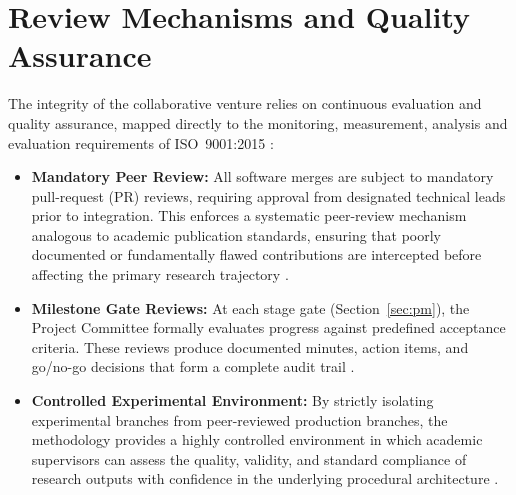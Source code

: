 \documentclass[11pt, a4paper]{article}
\begin{document}
\section{Review Mechanisms and Quality Assurance}\label{sec:qa}

The integrity of the collaborative venture relies on continuous evaluation and quality assurance, mapped directly to the monitoring, measurement, analysis and evaluation requirements of ISO~9001:2015 \cite{iso9001_2015}:

\begin{itemize}
    \item \textbf{Mandatory Peer Review:} All software merges are subject to mandatory pull-request (PR) reviews, requiring approval from designated technical leads prior to integration. This enforces a systematic peer-review mechanism analogous to academic publication standards, ensuring that poorly documented or fundamentally flawed contributions are intercepted before affecting the primary research trajectory \cite[Sec. 6.3.8 \& 6.4.9.3]{iso_iec_ieee_12207_2017}.
    
    \item \textbf{Milestone Gate Reviews:} At each stage gate (Section~\ref{sec:pm}), the Project Committee formally evaluates progress against predefined acceptance criteria. These reviews produce documented minutes, action items, and go/no-go decisions that form a complete audit trail  \cite[Sec. 6.6.4]{iso21502_2020} \cite{cooper2010stage} \cite[Sec. 9.3.3]{iso9001_2015}.
    
    \item \textbf{Controlled Experimental Environment:} By strictly isolating experimental branches from peer-reviewed production branches, the methodology provides a highly controlled environment in which academic supervisors can assess the quality, validity, and standard compliance of research outputs with confidence in the underlying procedural architecture \cite[Sec. 6.3.5]{iso_iec_ieee_12207_2017} \cite[Sec. 8.5.2]{iso9001_2015}.
    
\end{itemize}

\newpage
\printbibliography
\end{document}
